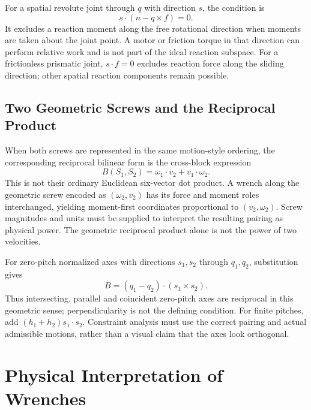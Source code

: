 For a spatial revolute joint through $q$ with direction $s$, the condition is
\begin{equation}
 s\cdot(n-q\times f)=0.
\end{equation}
It excludes a reaction moment along the free rotational direction when moments are taken about the joint point. A motor or friction torque in that direction can perform relative work and is not part of the ideal reaction subspace. For a frictionless prismatic joint, $s\cdot f=0$ excludes reaction force along the sliding direction; other spatial reaction components remain possible.

\subsection{Two Geometric Screws and the Reciprocal Product}

When both screws are represented in the same motion-style ordering, the corresponding reciprocal bilinear form is the cross-block expression
\begin{equation}
 B(S_1,S_2)=\omega_1\cdot v_2+v_1\cdot\omega_2.
\end{equation}
This is not their ordinary Euclidean six-vector dot product. A wrench along the geometric screw encoded as $(\omega_2,v_2)$ has its force and moment roles interchanged, yielding moment-first coordinates proportional to $(v_2,\omega_2)$. Screw magnitudes and units must be supplied to interpret the resulting pairing as physical power. The geometric reciprocal product alone is not the power of two velocities.

For zero-pitch normalized axes with directions $s_1,s_2$ through $q_1,q_2$, substitution gives
\begin{equation}
 B=(q_1-q_2)\cdot(s_1\times s_2).
\end{equation}
Thus intersecting, parallel and coincident zero-pitch axes are reciprocal in this geometric sense; perpendicularity is not the defining condition. For finite pitches, add $(h_1+h_2)s_1\cdot s_2$. Constraint analysis must use the correct pairing and actual admissible motions, rather than a visual claim that the axes look orthogonal.

\section{Physical Interpretation of Wrenches}
\label{sec:wrench_physical}
\label{ex:gravity_wrench}
\label{laymans:wrench_unified}

